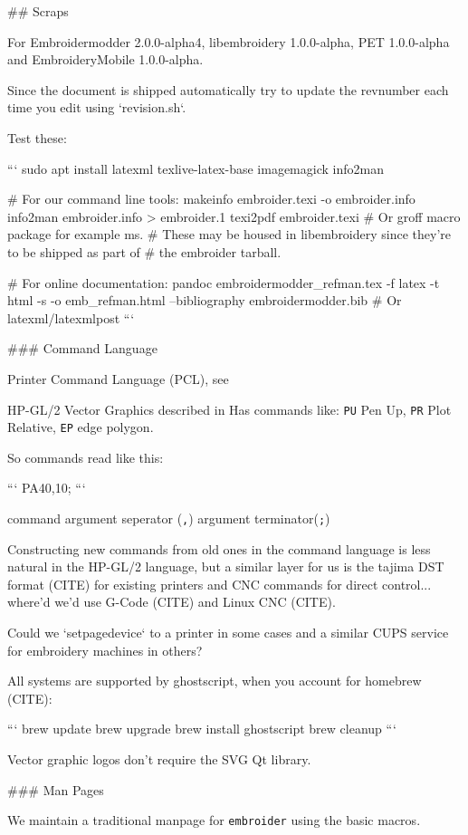 
## Scraps

For
Embroidermodder 2.0.0-alpha4, libembroidery 1.0.0-alpha, PET 1.0.0-alpha
and EmbroideryMobile 1.0.0-alpha.

Since the document is shipped automatically try to update the revnumber each
time you edit using `revision.sh`.

Test these:

```
sudo apt install latexml texlive-latex-base imagemagick info2man

# For our command line tools:
makeinfo embroider.texi -o embroider.info
info2man embroider.info > embroider.1
texi2pdf embroider.texi
# Or groff macro package for example ms.
# These may be housed in libembroidery since they're to be shipped as part of
# the embroider tarball.

# For online documentation:
pandoc embroidermodder_refman.tex -f latex -t html -s -o emb_refman.html --bibliography embroidermodder.bib
# Or latexml/latexmlpost
```

### Command Language

Printer Command Language (PCL), see %

HP-GL/2 Vector Graphics  described in %
Has commands like: \texttt{PU} Pen Up, \texttt{PR} Plot Relative,
\texttt{EP} edge polygon.

So commands read like this:

```
PA40,10;
```

command argument seperator (\texttt{,}) argument terminator(\texttt{;})

Constructing new commands from old ones in the command language is less
natural in the HP-GL/2 language, but a similar layer for us is
the tajima DST format (CITE) for existing printers and CNC commands for
direct control... where'd we'd use G-Code (CITE) and Linux CNC (CITE).

Could we `setpagedevice` to a printer in some cases and a similar CUPS service
for embroidery machines in others?

All systems are supported by ghostscript, when you account for homebrew (CITE):

```
brew update
brew upgrade
brew install ghostscript
brew cleanup
```

Vector graphic logos don't require the SVG Qt library.

### Man Pages

We maintain a traditional manpage for \texttt{embroider} using
the basic macros.

